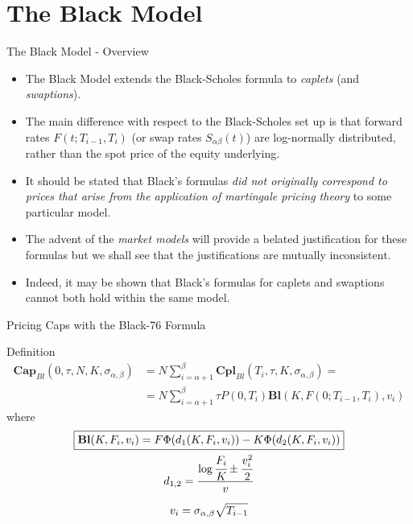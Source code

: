 \documentclass{beamer}
\begin{document}
\section{The Black Model}
\begin{frame}{The Black Model - Overview}
\begin{itemize}
\item The \textcolor{maincolor}{Black Model} extends the Black-Scholes formula to \emph{caplets} (and \emph{swaptions}). 
\item The main difference with respect to the Black-Scholes set up is that \textcolor{maincolor}{forward rates $F(t;T_{i-1},T_i)$ (or swap rates $S_{\alpha\beta}(t)$) are log-normally distributed}, rather than the spot price of the equity underlying.
\item It should be stated that Black’s formulas \emph{did not originally correspond to prices that arise from the application of martingale pricing theory} to some particular model.
\item The advent of the \emph{market models} will provide a belated justification for these formulas but we shall see that the justifications are mutually inconsistent.
\item Indeed, it may be shown that Black’s formulas for caplets and swaptions cannot both hold within the same model.
\end{itemize}
\end{frame}

\begin{frame}{Pricing Caps with the Black-76 Formula}
\begin{block}{Definition}
\begin{equation}
	\begin{aligned}
		\textbf{Cap}_{Bl}(0, \tau,N,K,\sigma_{\alpha,\beta}) &= N\sum_{i=\alpha+1}^{\beta}\textbf{Cpl}_{Bl}(T_i, \tau,K,\sigma_{\alpha,\beta}) = \\ &=N\sum_{i=\alpha+1}^{\beta}\tau P(0,T_i) \textbf{Bl}(K,F(0;T_{i-1},T_i),v_i)
	\end{aligned}
	\label{eq:cap_black}
\end{equation}
where
\begin{equation*}
	\begin{gathered}
		\boxed{\textbf{Bl}(K,F_i,v_i)=F\Phi(d_1(K,F_i,v_i)) - K\Phi(d_2(K,F_i,v_i))} \\
		d_{1,2} = \frac{\log{\cfrac{F_i}{K}} \pm \cfrac{v_i^2}{2}}{v} \\[0.2cm]
		v_i = \sigma_{\alpha,\beta}\sqrt{T_{i-1}}
	\end{gathered}
\end{equation*}
\end{block}
\end{frame}
\end{document}
